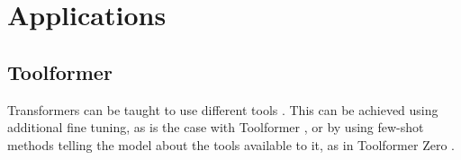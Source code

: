 \documentclass[twoside]{article}
\begin{document}
\section{Applications}

\subsection{Toolformer}
Transformers can be taught to use different tools \cite{schick_toolformer_2023}. 
This can be achieved using additional fine tuning, as is the case with Toolformer
\cite{schick_toolformer_2023}, or by using few-shot methods telling the model 
about the tools available to it, as in Toolformer Zero \cite{markus_toolformer_2023}.


\printbibliography
\end{document}
